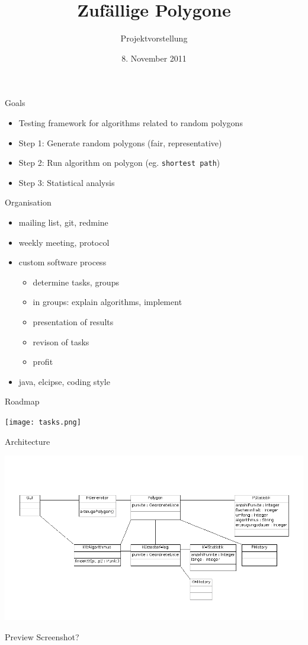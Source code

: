 \documentclass[ucs,11pt]{beamer}
\title[Zufällige Polygone]{Zufällige Polygone}
\subtitle{Projektvorstellung}
\institute[FU Berlin]{Freie Universität Berlin}
\date[08.11.2011]{8. November 2011}
\begin{document}
\begin{frame}[plain]
	\titlepage
\end{frame}

\begin{frame}{Goals}
	\begin{itemize}
	\item Testing framework for algorithms related to random polygons
	\item Step 1: Generate random polygons (fair, representative)
	\item Step 2: Run algorithm on polygon (eg. \texttt{shortest path})
	\item Step 3: Statistical analysis
	\end{itemize}
\end{frame}

\begin{frame}{Organisation}
  \begin{itemize}
    \item mailing list, git, redmine
    \item weekly meeting, protocol
    \item custom software process
      \begin{itemize}
        \item determine tasks, groups
        \item in groups: explain algorithms, implement
        \item presentation of results
        \item revison of tasks
        \item profit
      \end{itemize}
    \item java, elcipse, coding style
  \end{itemize}
\end{frame}

\begin{frame}{Roadmap}
  \begin{center}
	  \texttt{[image: tasks.png]}
  \end{center}
\end{frame}

\begin{frame}{Architecture}
  \begin{center}
	  \includegraphics[width=\textwidth]{ClassDiagram.png}
  \end{center}
\end{frame}

\begin{frame}{Preview}
Screenshot?
\end{frame}
\end{document}
